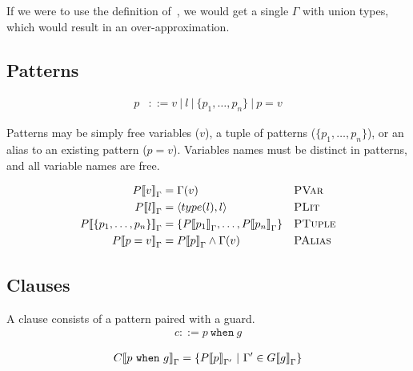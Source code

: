 \documentclass[nonacm,timestamp,manuscript]{acmart}
\newcommand{\alt}{\ |\ }
\newcommand{\singleton}[2]{\langle #1, #2 \rangle} %
\newcommand{\res}[1]{\texttt{#1}}
\begin{document}
If we were to use the definition of~\cite{Pearce2013}, we would get a single
$\Gamma$ with union types, which would result in an over-approximation.



\subsection{Patterns}
\begin{align*}
  p &{}::= v \alt l \alt \{ p_1, \ldots, p_n \} \alt p = v
\end{align*}

Patterns may be simply free variables ($v$), a tuple of patterns
($\{ p_1, \ldots, p_n \}$), or an alias to an existing pattern ($p = v$). Variables
names must be distinct in patterns, and all variable names are free.

\newcommand{\Pden}[2][\Gamma]{{P\llbracket{} #2 \rrbracket{}}_{#1}}
\begin{definition}
\begin{align*}
  \Pden{v
  } ={}& \Gamma(v)
  && \textsc{PVar} \\
  \Pden{l
  } ={}& \singleton{type(l)}{l}
  && \textsc{PLit} \\
  \Pden{ \{ p_1, \ldots, p_n\}
  } ={}& \{ \Pden{p_1}, \ldots, \Pden{p_n} \}
  && \textsc{PTuple} \\
  \Pden{p = v
  } ={}& \Pden{p} \land \Gamma(v)
  && \textsc{PAlias}
\end{align*}
\end{definition}

\subsection{Clauses}

A clause consists of a pattern paired with a guard.
\begin{align*}
  c ::= p\ \res{when}\ g
\end{align*}

\newcommand{\Cden}[2][\Gamma]{{C \llbracket{} #2 \rrbracket}_{#1}}

\begin{definition}

  \begin{align*}
    \Cden{p\ \res{when}\ g} = \left\{ \Pden[\Gamma^{\prime}]{p}\ \middle|\ \Gamma^{\prime} \in \Gden[\Gamma]{g} \right\}
  \end{align*}
\end{definition}
\end{document}
